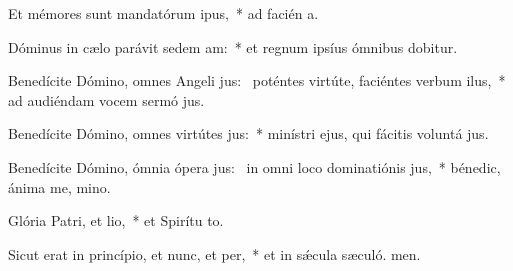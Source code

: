 \item Et mémores sunt mandatórum ipus,~* ad facién a.
\item Dóminus in cælo parávit sedem am:~* et regnum ipsíus ómnibus dobitur.
\item Benedícite Dómino, omnes Angeli jus:~\pscross{} poténtes virtúte, faciéntes verbum ilus,~* ad audiéndam vocem sermó jus.
\item Benedícite Dómino, omnes virtútes jus:~* minístri ejus, qui fácitis voluntá jus.
\item Benedícite Dómino, ómnia ópera jus:~\pscross{} in omni loco dominatiónis jus,~* bénedic, ánima me, mino.
\item Glória Patri, et lio,~* et Spirítu to.
\item Sicut erat in princípio, et nunc, et per,~* et in sǽcula sæculó. men.

